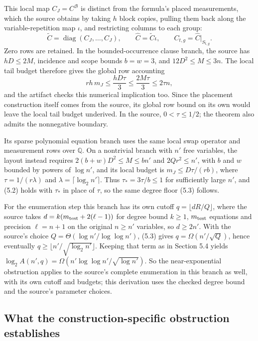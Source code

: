 \documentclass[11pt,letterpaper]{article}
\begin{document}
This local map \(C_J=C^{\mathcal B}\) is distinct from the formula's
placed measurements, which the source obtains by taking \(h\) block
copies, pulling them back along the variable-repetition map \(\iota\),
and restricting columns to each group:
\[\widetilde C=\operatorname{diag}(C_J,\ldots,C_J),
\qquad \widehat C=\widetilde C\iota,
\qquad C_{t,g}=\widehat C|_{S_{t,g}}.\] Zero rows are retained. In the
bounded-occurrence clause branch, the source has \(hD\le2M\), incidence
and scope bounds \(b=w=3\), and \(12D^2\le M\le3n\). The local tail
budget therefore gives the global row accounting
\[rh\,m_J\le\frac{hD\tau}{3}
          \le\frac{2M\tau}{3}\le2\tau n,\] and the artifact checks this
numerical implication too. Since the placement construction itself comes
from the source, its global row bound on its own would leave the local
tail budget underived. In the source, \(0<\tau\le1/2\); the theorem also
admits the nonnegative boundary.

Its sparse polynomial equation branch \citep[Sections 4.7 and
5.2--5.5]{O26} uses the same local swap operator and measurement rows
over \(\mathbb Q\). On a nontrivial branch with \(n'\) free variables,
the layout instead requires \(2(b+w)D^2\le M\le bn'\) and
\(2Qr^2\le n'\), with \(b\) and \(w\) bounded by powers of \(\log n'\),
and its local budget is \(m_J\le D\tau/(rb)\), where
\(\tau=1/(r\lambda)\) and \(\lambda=\lceil\log_2 n'\rceil\). Thus
\(\tau_* = 3\tau/b\le1\) for sufficiently large \(n'\), and (5.2) holds
with \(\tau_*\) in place of \(\tau\), so the same degree floor (5.3)
follows.

For the enumeration step this branch has its own cutoff
\(q=\lfloor dR/Q\rfloor\), where the source takes
\(d=k(m_{\rm test}+2(\ell-1))\) for degree bound \(k\ge1\),
\(m_{\rm test}\) equations and precision \(\ell=n+1\) on the original
\(n\ge n'\) variables, so \(d\ge2n'\). With the source's choice
\(Q=\Theta(\log n'/\log\log n')\), (5.3) gives \(q=\Omega(n'/\sqrt Q)\),
hence eventually \(q\ge\lfloor n'/\sqrt{\log_2 n'}\rfloor\). Keeping
that term as in Section 5.4 yields
\(\log_2 A(n',q)=\Omega(n'\log\log n'/\sqrt{\log n'})\). So the
near-exponential obstruction applies to the source's complete
enumeration in this branch as well, with its own cutoff and budgets;
this derivation uses the checked degree bound and the source's parameter
choices.

\subsection{What the construction-specific obstruction
establishes}\label{what-the-construction-specific-obstruction-establishes}
\end{document}
